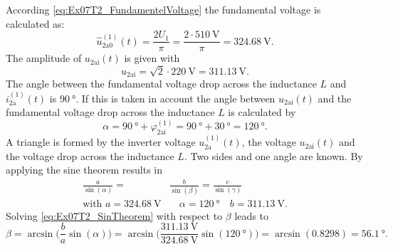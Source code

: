 \begin{solutionblock}
    According \eqref{eq:Ex07T2_FundamentelVoltage} the fundamental voltage  is calculated as:
    \begin{equation}
        \hat{u}_\mathrm{2a0}^\mathrm{(1)}(t)=\frac{2U_{\mathrm{1}}}{\pi}=\frac{2\cdot \SI{510}{\volt}}{\pi}=\SI{324.68}{\volt}.
    \end{equation}
    The amplitude of $u_\mathrm{2ai}(t)$ is given with
    \begin{equation}
        \hat{u}_\mathrm{2ai}=\sqrt{2} \cdot \SI{220}{\volt}=\SI{311.13}{\volt}.
    \end{equation}
    The angle between the  fundamental voltage drop across the inductance $L$ and $i_\mathrm{2a}^\mathrm{(1)}(t)$ is $\SI{90}{\degree}$. 
    If this is taken in account the angle between $u_\mathrm{2ai}(t)$ and the fundamental voltage drop across 
    the inductance $L$ is calculated by
    \begin{equation}
        \alpha=\SI{90}{\degree}+\varphi_{\mathrm{2ai}}^\mathrm{(1)}=\SI{90}{\degree}+\SI{30}{\degree}=\SI{120}{\degree}.  
    \end{equation}
    A triangle is formed by the inverter voltage $u_\mathrm{2a}^\mathrm{(1)}(t)$, the voltage $u_\mathrm{2ai}(t)$ 
    and the voltage drop across the inductance $L$. Two sides and one angle are known. By applying the sine theorem results in
    \begin{equation}
        \begin{split}        
            \frac{a}{\sin(\alpha)} = &\frac{b}{\sin(\beta)} = \frac{c}{\sin(\gamma)} \\
            \text{with } a=\SI{324.68}{\volt} &\quad \alpha=\SI{120}{\degree} \quad b=\SI{311.13}{\volt}.
            \label{eq:Ex07T2_SinTheorem}
        \end{split}                 
    \end{equation}   
    Solving \eqref{eq:Ex07T2_SinTheorem} with respect to $\beta$ leads to
    \begin{equation}
        \beta=\arcsin\big(\frac{b}{a}\sin(\alpha)\big) 
        =\arcsin\big(\frac{\SI{311.13}{\volt}}{\SI{324.68}{\volt}}\sin(\SI{120}{\degree})\big) = \arcsin(0.8298)=\SI{56.1}{\degree}.
        \label{eq:Ex07T2_sin_beta}
    \end{equation}

\end{solutionblock}
